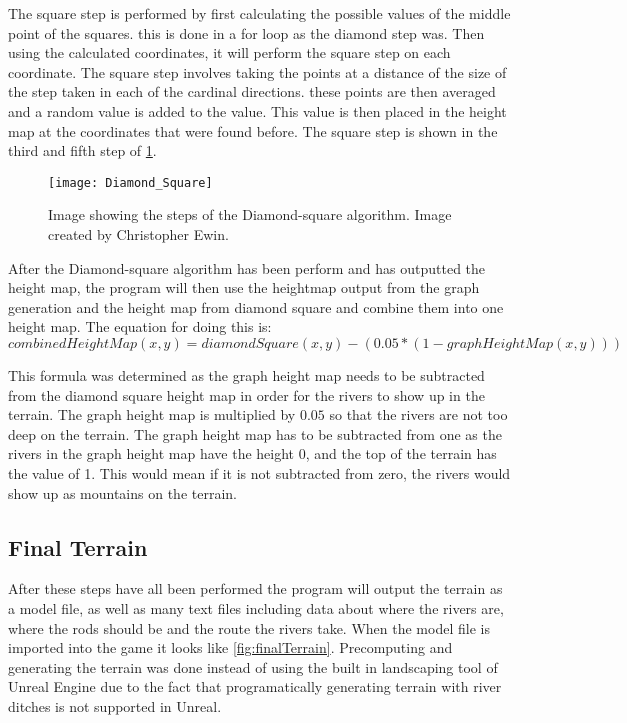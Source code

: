 
	The square step is performed by first calculating the possible values of the middle point of the squares. this is done in a for loop as the diamond step was. Then using the calculated coordinates, it will perform the square step on each coordinate. The square step involves taking the points at a distance of the size of the step taken in each of the cardinal directions. these points are then averaged and a random value is added to the value. This value is then placed in the height map at the coordinates that were found before. The square step is shown in the third and fifth step of \ref{fig:DiamondSquare}.

\begin{figure}[H]
	\texttt{[image: Diamond\_Square]}
	\centering
	\caption{Image showing the steps of the Diamond-square algorithm. Image created by Christopher Ewin.}
	\label{fig:DiamondSquare}
\end{figure}

	After the Diamond-square algorithm has been perform and has outputted the height map, the program will then use the heightmap output from the graph generation and the height map from diamond square and combine them into one height map. The equation for doing this is:\\

	$$combinedHeightMap(x, y) =  diamondSquare(x, y) - (0.05 * (1 - graphHeightMap(x, y)))$$

	This formula was determined as the graph height map needs to be subtracted from the diamond square height map in order for the rivers to show up in the terrain. The graph height map is multiplied by $0.05$ so that the rivers are not too deep on the terrain. The graph height map has to be subtracted from one as the rivers in the graph height map have the height 0, and the top of the terrain has the value of 1. This would mean if it is not subtracted from zero, the rivers would show up as mountains on the terrain.\\

\subsection{Final Terrain}
	After these steps have all been performed the program will output the terrain as a model file, as well as many text files including data about where the rivers are, where the rods should be and the route the rivers take. When the model file is imported into the game it looks like \ref{fig:finalTerrain}. Precomputing and generating the terrain was done instead of using the built in landscaping tool of Unreal Engine due to the fact that programatically generating terrain with river ditches is not supported in Unreal.

